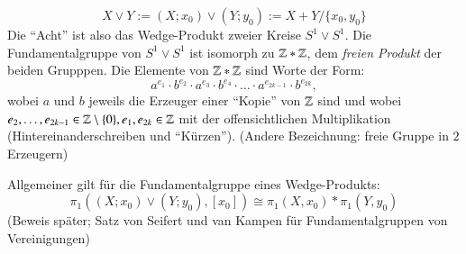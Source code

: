 \documentclass[a4paper,10pt]{scrartcl}
\newcommand{\homo}{\cong}
\begin{document}
$$X\lor Y:= (X;x_0) \lor (Y;y_0):=X+Y/{\{x_0,y_0\}} $$
Die "`Acht"' ist also das Wedge-Produkt zweier Kreise $S^1\lor S^1$. Die Fundamentalgruppe von $S^1 \lor S^1$ ist isomorph zu $\mathbb{Z}*\mathbb{Z}$, dem \emph{freien Produkt} der beiden Grupppen. Die Elemente von $\mathbb{Z}*\mathbb{Z}$ sind Worte der Form:
\[
 a^{e_1}\cdot b^{e_2} \cdot a^{e_3} \cdot b^{e_4}\cdot \dotsc \cdot a^{e_{2k-1}}\cdot b^{e_{2k}},
\]
wobei $a$ und $b$ jeweils die Erzeuger einer "`Kopie"' von $\mathbb{Z}$ sind und wobei $e_2, \dotsc, e_{2k-1}\in \mathbb{Z}\setminus\{0\}, e_1, e_{2k} \in \mathbb{Z}$ mit der offensichtlichen Multiplikation (Hintereinanderschreiben und "`Kürzen"'). (Andere Bezeichnung: freie Gruppe in $2$ Erzeugern)

\begin{seg}{Allgemeiner gilt}
 für die Fundamentalgruppe eines Wedge-Produkts:
\[
 \pi_1((X;x_0) \lor (Y;y_0), [x_0])\homo \pi_1(X,x_0)* \pi_1(Y,y_0)
\]
(Beweis später; Satz von Seifert und van Kampen für Fundamentalgruppen von Vereinigungen)
\end{seg}
\end{document}
